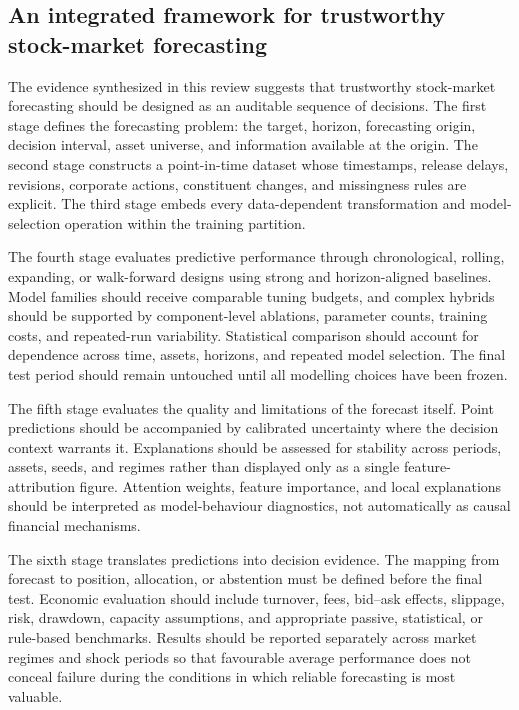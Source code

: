 \documentclass[pdflatex,sn-mathphys-num]{sn-jnl}%
\theoremstyle{thmstyleone}%
\theoremstyle{thmstyletwo}%
\theoremstyle{thmstylethree}%
\begin{document}
\subsection{An integrated framework for trustworthy stock-market forecasting}
\label{subsec:integrated-trustworthy-framework}

The evidence synthesized in this review suggests that trustworthy stock-market
forecasting should be designed as an auditable sequence of decisions. The first
stage defines the forecasting problem: the target, horizon, forecasting origin,
decision interval, asset universe, and information available at the origin. The
second stage constructs a point-in-time dataset whose timestamps, release delays,
revisions, corporate actions, constituent changes, and missingness rules are
explicit. The third stage embeds every data-dependent transformation and
model-selection operation within the training partition.

The fourth stage evaluates predictive performance through chronological,
rolling, expanding, or walk-forward designs using strong and horizon-aligned
baselines. Model families should receive comparable tuning budgets, and complex
hybrids should be supported by component-level ablations, parameter counts,
training costs, and repeated-run variability. Statistical comparison should
account for dependence across time, assets, horizons, and repeated model
selection. The final test period should remain untouched until all modelling
choices have been frozen.

The fifth stage evaluates the quality and limitations of the forecast itself.
Point predictions should be accompanied by calibrated uncertainty where the
decision context warrants it. Explanations should be assessed for stability
across periods, assets, seeds, and regimes rather than displayed only as a single
feature-attribution figure. Attention weights, feature importance, and local
explanations should be interpreted as model-behaviour diagnostics, not
automatically as causal financial mechanisms.

The sixth stage translates predictions into decision evidence. The mapping from
forecast to position, allocation, or abstention must be defined before the final
test. Economic evaluation should include turnover, fees, bid--ask effects,
slippage, risk, drawdown, capacity assumptions, and appropriate passive,
statistical, or rule-based benchmarks. Results should be reported separately
across market regimes and shock periods so that favourable average performance
does not conceal failure during the conditions in which reliable forecasting is
most valuable.
\end{document}

